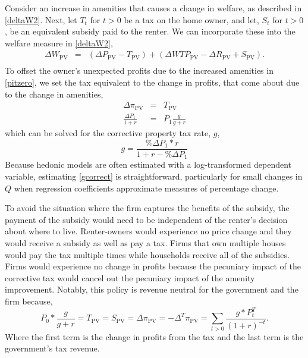 \documentclass[ecta,nameyear,draft]{econsocart}
\theoremstyle{plain}
\theoremstyle{remark}
\begin{document}
Consider an increase in amenities that causes a change in welfare, as described in \ref{deltaW2}. Next, let $T_t$ for $t>0$ be a tax on the home owner, and let, $S_t$ for $t>0$, be an equivalent subsidy paid to the renter. We can incorporate these into the welfare measure in \ref{deltaW2},
\begin{eqnarray*}
	\Delta W_{\mathrm{PV}}&=& \left(\Delta P_{\mathrm{PV}}-T_{\mathrm{PV}}\right)+\left(\Delta\mathit{WTP}_\mathrm{PV}-\Delta R_{\mathrm{PV}}+S_{\mathrm{PV}}\right).\nonumber\\
\end{eqnarray*}
To offset the owner's unexpected profits due to the increased amenities in \ref{pitzero}, we set the tax equivalent to the change in profits, that come about due to the change in amenities,
\begin{eqnarray*}
 \Delta \pi_{\mathrm{PV}}&=&T_{\mathrm{PV}}\\
\frac{\Delta P_1}{1+r}&=&P_1\frac{g}{g+r}
\end{eqnarray*}
which can be solved for the corrective property tax rate, $g$,
\begin{equation}
	g=\frac{\% \Delta P_1*r}{1+r-\% \Delta P_1} \label{gcorrect}
\end{equation}
Because hedonic models are often estimated with a log-transformed dependent variable, estimating \ref{gcorrect} is straightforward, particularly for small changes in $Q$ when regression coefficients approximate measures of percentage change. 

To avoid the situation where the firm captures the benefits of the subsidy, the payment of the subsidy would need to be independent of the renter's decision about where to live. Renter-owners would experience no price change and they would receive a subsidy as well as pay a tax. Firms that own multiple houses would pay the tax multiple times while households receive all of the subsidies. Firms would experience no change in profits because the pecuniary impact of the corrective tax would cancel out the pecuniary impact of the amenity improvement.
Notably, this policy is revenue neutral for the government and the firm because, 
\begin{equation}
	P_0*\frac{g}{g+r}=T_{\mathrm{PV}}=S_{\mathrm{PV}}=\Delta \pi_{\mathrm{PV}}=-\Delta^T \pi_{\mathrm{PV}}=\sum_{t>0}\frac{g*P_t^T}{(1+r)^{-t}}.
\end{equation}
Where the first term is the change in profits from the tax and the last term is the government's tax revenue. 
\end{document}
